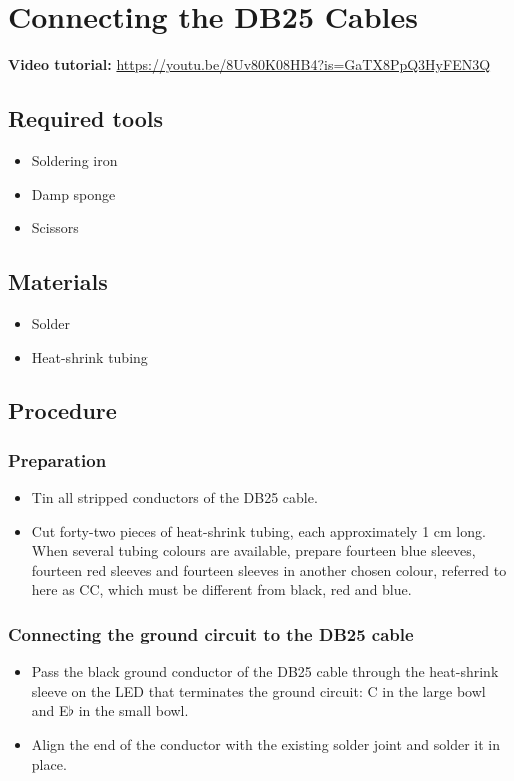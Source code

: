 \documentclass[11pt,a4paper]{article}
\newcommand{\tutorial}[1]{\textbf{Video tutorial:} \url{#1}}
\newcommand{\tools}{\subsection{Required tools}}
\newcommand{\materials}{\subsection{Materials}}
\newcommand{\procedure}{\subsection{Procedure}}
\begin{document}
\section{Connecting the DB25 Cables}
\tutorial{https://youtu.be/8Uv80K08HB4?is=GaTX8PpQ3HyFEN3Q}

\tools
\begin{itemize}
  \item Soldering iron
  \item Damp sponge
  \item Scissors
\end{itemize}

\materials
\begin{itemize}
  \item Solder
  \item Heat-shrink tubing
\end{itemize}

\procedure
\subsubsection{Preparation}
\begin{itemize}
  \item Tin all stripped conductors of the DB25 cable.
  \item Cut forty-two pieces of heat-shrink tubing, each approximately 1 cm long. When several tubing colours are available, prepare fourteen blue sleeves, fourteen red sleeves and fourteen sleeves in another chosen colour, referred to here as CC, which must be different from black, red and blue.
\end{itemize}

\subsubsection{Connecting the ground circuit to the DB25 cable}
\begin{itemize}
  \item Pass the black ground conductor of the DB25 cable through the heat-shrink sleeve on the LED that terminates the ground circuit: C in the large bowl and E$\flat$ in the small bowl.
  \item Align the end of the conductor with the existing solder joint and solder it in place.
\end{itemize}
\end{document}
